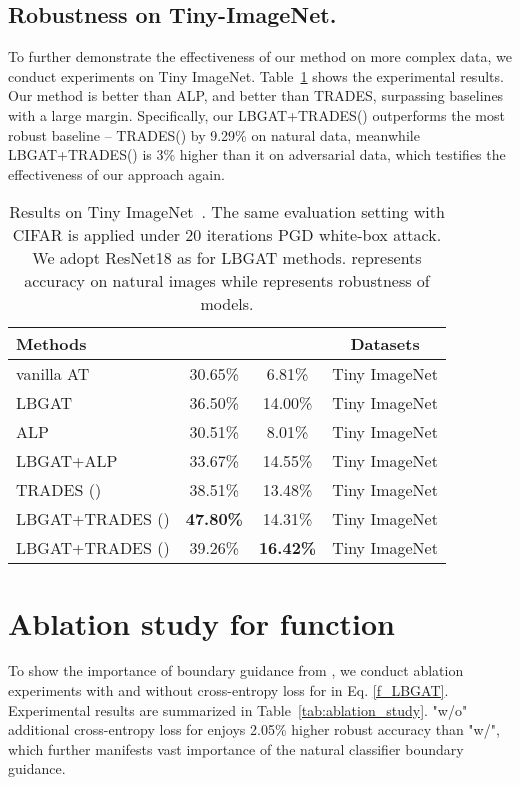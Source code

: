 \documentclass[final]{cvpr}
\begin{document}
\subsection{Robustness on Tiny-ImageNet.}
To further demonstrate the effectiveness of our method on more complex data, we conduct experiments on Tiny ImageNet. Table~\ref{tab:Tiny_ImageNet} shows the experimental results. Our method is better than ALP, and better than TRADES, surpassing baselines with a large margin. Specifically, our LBGAT+TRADES() outperforms the most robust baseline -- TRADES() by 9.29\% on natural data, meanwhile LBGAT+TRADES() is 3\% higher than it on adversarial data, which testifies the effectiveness of our approach again.

\begin{table}[h]
	\footnotesize
	\centering
	\caption{Results on Tiny ImageNet~\cite{DBLP:conf/cvpr/DengDSLL009}. The same evaluation setting with CIFAR is applied under 20 iterations PGD white-box attack. We adopt ResNet18 as  for LBGAT methods.  represents accuracy on natural images while  represents robustness of models.} 
	\vspace{0.1cm}
	\begin{tabular}{l|c|c|c}
		\textbf{Methods} & & &\textbf{Datasets} \\
		\hline
		\hline
		vanilla AT &30.65\% &6.81\% &Tiny ImageNet\\
		LBGAT       &36.50\% &14.00\% &Tiny ImageNet \\
		ALP &30.51\% &8.01\% &Tiny ImageNet \\
		LBGAT+ALP &33.67\% &14.55\% &Tiny ImageNet \\
TRADES () &38.51\% &13.48\% &Tiny ImageNet \\
		LBGAT+TRADES () &\textbf{47.80\%} &14.31\% &Tiny ImageNet \\
		LBGAT+TRADES () &39.26\% &\textbf{16.42\%} &Tiny ImageNet \\
		\hline
		\hline
	\end{tabular}
	\label{tab:Tiny_ImageNet}
\end{table}

\section{Ablation study for  function}
\label{sec:L_function}
To show the importance of boundary guidance from , we conduct ablation experiments with and without cross-entropy loss for  in Eq. \eqref{f_LBGAT}. Experimental results are summarized in Table~\ref{tab:ablation_study}. "w/o" additional cross-entropy loss for  enjoys 2.05\% higher robust accuracy than "w/", which further manifests vast importance of the natural classifier boundary guidance.  
\end{document}
